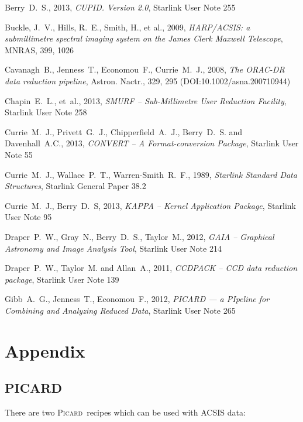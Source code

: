 \documentclass[twoside,11pt]{article}
\newcommand{\htmladdnormallink}[2]{#1}
\newcommand{\xref}[3]{#1}
\renewcommand{\_}{\texttt{\symbol{95}}}
\newcommand{\picard}{\xref{\textsc{Picard}}{sun265}{}}
\begin{document}
\begin{thebibliography}{}


Berry~D.~S., 2013, \textit{CUPID. Version 2.0}, \xref{Starlink User Note 255}{sun255}{}

Buckle, J.~V., Hills, R.~E., Smith, H., et al., 2009, 
\textit{HARP/ACSIS: a submillimetre spectral imaging system on the James Clerk Maxwell Telescope},
MNRAS, 399, 1026 

Cavanagh~B., Jenness~T., Economou~F., Currie~M.~J., 2008,
\htmladdnormallink{\textit{The ORAC-DR data reduction pipeline}}{http://dx.doi.org/10.1002/asna.200710944}, Astron. Nactr., 329, 295 (DOI:10.1002/asna.200710944)

Chapin~E.~L., et~al., 2013, \textit{SMURF -- Sub-Millimetre User Reduction
Facility}, \xref{Starlink User Note 258}{sun258}{}

Currie~M.~J., Privett~G.~J., Chipperfield~A.~J., Berry~D.~S. and Davenhall~A.C., 2013, \textit{CONVERT -- A Format-conversion Package}, \xref{Starlink User Note 55}{sun55}{}

Currie~M.~J., Wallace~P.~T., Warren-Smith~R.~F., 1989,
\textit{Starlink Standard Data Structures}, \xref{Starlink General
Paper 38.2}{sgp38}{}

Currie~M.~J., Berry~D.~S, 2013, \textit{KAPPA -- Kernel Application Package},
\xref{Starlink User Note 95}{sun95}{}

Draper~P.~W., Gray~N., Berry~D.~S., Taylor~M., 2012,
\textit{GAIA -- Graphical Astronomy and Image Analysis Tool},
\xref{Starlink User Note 214}{sun214}{}

Draper~P.~W., Taylor~M. and Allan~A., 2011, \textit{CCDPACK -- CCD data reduction package},
\xref{Starlink User Note 139}{sun139}{}

Gibb~A.~G., Jenness~T., Economou~F., 2012, \textit{PICARD --- a
PIpeline for Combining and Analyzing Reduced Data},
\xref{Starlink User Note 265}{sun265}{}

\end{thebibliography}

\newpage
\appendix
\section[Appendices]{Appendix}

\subsection{PICARD}
\label{app:picard}
There are two \picard\ recipes which can be used with ACSIS data:
\end{document}
